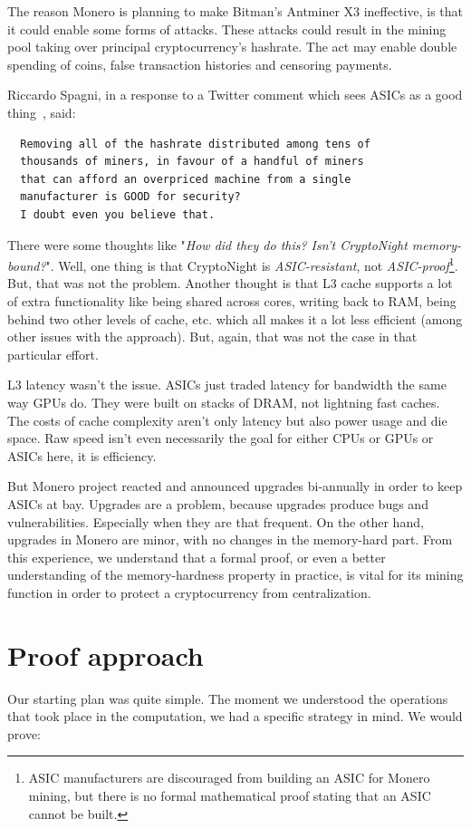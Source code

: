 The reason Monero is planning to make Bitman’s Antminer X3 ineffective, is that it could enable some forms of attacks. These attacks could result in the mining pool taking over principal cryptocurrency’s hashrate. The act may enable double spending of coins, false transaction histories and censoring payments.

Riccardo Spagni, in a response to a Twitter comment which sees ASICs as a good thing~\cite{fluffypony}, said:
\begin{verbatim}
  Removing all of the hashrate distributed among tens of
  thousands of miners, in favour of a handful of miners
  that can afford an overpriced machine from a single
  manufacturer is GOOD for security?
  I doubt even you believe that.
\end{verbatim}

There were some thoughts like "\emph{How did they do this? Isn't CryptoNight memory-bound?}". Well, one thing is that CryptoNight is \emph{ASIC-resistant}, not \emph{ASIC-proof}\footnote{ASIC manufacturers are discouraged from building an ASIC for Monero mining, but there is no formal mathematical proof stating that an ASIC cannot be built.}. But, that was not the problem. Another thought is that L3 cache supports a lot of extra functionality like being shared across cores, writing back to RAM, being behind two other levels of cache, etc. which all makes it a lot less efficient (among other issues with the approach). But, again, that was not the case in that particular effort.

L3 latency wasn't the issue. ASICs just traded latency for bandwidth the same way GPUs do. They were built on stacks of DRAM, not lightning fast caches. The costs of cache complexity aren't only latency but also power usage and die space. Raw speed isn't even necessarily the goal for either CPUs or GPUs or ASICs here, it is efficiency.

But Monero project reacted and announced upgrades bi-annually in order to keep ASICs at bay. Upgrades are a problem, because upgrades produce bugs and vulnerabilities. Especially when they are that frequent. On the other hand, upgrades in Monero are minor, with no changes in the memory-hard part. From this experience, we understand that a formal proof, or even a better understanding of the memory-hardness property in practice, is vital for its mining function in order to protect a cryptocurrency from centralization.

\section{Proof approach}
Our starting plan was quite simple. The moment we understood the operations that took place in the computation, we had a specific strategy in mind. We would prove:


